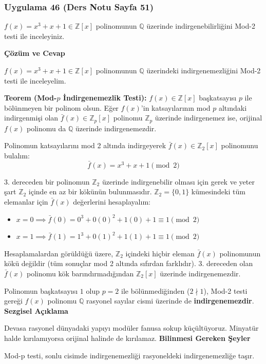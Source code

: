 \documentclass[11pt, a4paper]{article}
\newenvironment{cozum}{
    \vspace{0.5cm}
    \noindent\textcolor{green!60!black}{\faCheckCircle\enspace \textbf{\Large Çözüm ve Cevap}}\par\vspace{0.2cm}
}{}
\newenvironment{sezgisel}{
    \vspace{0.5cm}
    \noindent\textcolor{orange!80!black}{\faLightbulb\enspace \textbf{\Large Sezgisel Açıklama}}\par\vspace{0.2cm}
    \itshape
}{}
\newenvironment{bilgi}{
    \vspace{0.5cm}
    \noindent\textcolor{red!70!black}{\faExclamationTriangle\enspace \textbf{\Large Bilinmesi Gereken Şeyler}}\par\vspace{0.2cm}
}{}
\begin{document}
\subsubsection{Uygulama 46 (Ders Notu Sayfa 51)}
\begin{sorubox}
$f(x)=x^3+x+1 \in \mathbb{Z}[x]$ polinomunun $\mathbb{Q}$ üzerinde indirgenebilirliğini Mod-2 testi ile inceleyiniz.
\end{sorubox}
\begin{cozum}
$f(x) = x^{3} + x + 1 \in \mathbb{Z}[x]$ polinomunun $\mathbb{Q}$ üzerindeki indirgenemezliğini Mod-2 testi ile inceleyelim.

\textbf{Teorem (Mod-$p$ İndirgenemezlik Testi):} $f(x) \in \mathbb{Z}[x]$ başkatsayısı $p$ ile bölünmeyen bir polinom olsun. Eğer $f(x)$'in katsayılarının mod $p$ altındaki indirgenmişi olan $\bar{f}(x) \in \mathbb{Z}_p[x]$ polinomu $\mathbb{Z}_p$ üzerinde indirgenemez ise, orijinal $f(x)$ polinomu da $\mathbb{Q}$ üzerinde indirgenemezdir.

Polinomun katsayılarını mod 2 altında indirgeyerek $\bar{f}(x) \in \mathbb{Z}_{2}[x]$ polinomunu bulalım:
\[ \bar{f}(x) = x^{3} + x + 1 \pmod{2} \]

3. dereceden bir polinomun $\mathbb{Z}_{2}$ üzerinde indirgenebilir olması için gerek ve yeter şart $\mathbb{Z}_{2}$ içinde en az bir kökünün bulunmasıdır. $\mathbb{Z}_{2} = \{0, 1\}$ kümesindeki tüm elemanlar için $\bar{f}(x)$ değerlerini hesaplayalım:
\begin{itemize}
    \item $x = 0 \implies \bar{f}(0) = 0^3 + 0(0)^2 + 1(0) + 1 \equiv 1 \pmod{2}$
    \item $x = 1 \implies \bar{f}(1) = 1^3 + 0(1)^2 + 1(1) + 1 \equiv 1 \pmod{2}$
\end{itemize}

Hesaplamalardan görüldüğü üzere, $\mathbb{Z}_{2}$ içindeki hiçbir eleman $\bar{f}(x)$ polinomunun kökü değildir (tüm sonuçlar mod 2 altında sıfırdan farklıdır). 3. dereceden olan $\bar{f}(x)$ polinomu kök barındırmadığından $\mathbb{Z}_{2}[x]$ üzerinde indirgenemezdir.

Polinomun başkatsayısı $1$ olup $p = 2$ ile bölünmediğinden ($2 \nmid 1$), Mod-2 testi gereği $f(x)$ polinomu $\mathbb{Q}$ rasyonel sayılar cismi üzerinde de \textbf{indirgenemezdir}.
\end{cozum}
\begin{sezgisel}
Devasa rasyonel dünyadaki yapıyı modüler fanusa sokup küçültüyoruz. Minyatür halde kırılamıyorsa orijinal halinde de kırılamaz.
\end{sezgisel}
\begin{bilgi}
Mod-p testi, sonlu cisimde indirgenemezliği rasyoneldeki indirgenemezliğe taşır.
\end{bilgi}
\end{document}
